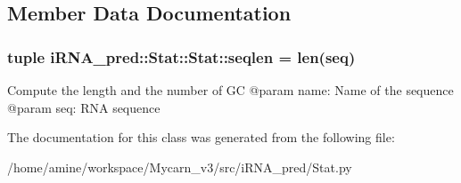 \subsection{\-Member \-Data \-Documentation}
\hypertarget{classiRNA__pred_1_1Stat_1_1Stat_a3a7dafa5e97f208ef4f625abec21d8d5}{
\subsubsection[{seqlen}]{\setlength{\rightskip}{0pt plus 5cm}tuple {\bf i\-R\-N\-A\-\_\-pred\-::\-Stat\-::\-Stat\-::seqlen} = len(seq)}}
\label{classiRNA__pred_1_1Stat_1_1Stat_a3a7dafa5e97f208ef4f625abec21d8d5}
\begin{DoxyVerb}
Compute the length and the number of GC
@param name: Name of the sequence
@param seq: RNA sequence
\end{DoxyVerb}
 

\-The documentation for this class was generated from the following file\-:\begin{DoxyCompactItemize}
\item 
/home/amine/workspace/\-Mycarn\-\_\-v3/src/i\-R\-N\-A\-\_\-pred/\-Stat.\-py\end{DoxyCompactItemize}
